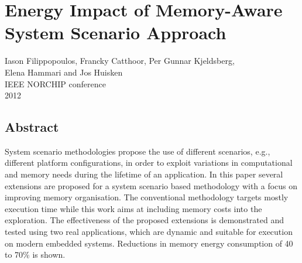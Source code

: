 %
%


\chapter{Energy Impact of Memory-Aware System Scenario Approach}

\begin{center}
Iason Filippopoulos, Francky Catthoor, Per Gunnar Kjeldsberg, \\ Elena Hammari and Jos Huisken
\\
IEEE NORCHIP conference
\\
2012
\end{center}
\afterpage{\null\newpage}
\newpage

\vspace*{\fill}
\section*{\hspace*{\fill} Abstract \hspace*{\fill}}
System scenario methodologies propose the use of different scenarios, e.g., different platform configurations, in order to exploit variations in computational and memory needs during the lifetime of an application. In this paper several extensions are proposed for a system scenario based methodology with a focus on improving memory organisation. The conventional methodology targets mostly execution time while this work aims at including memory costs into the exploration. The effectiveness of the proposed extensions is demonstrated and tested using two real applications, which are dynamic and suitable for execution on modern embedded systems. Reductions in memory energy consumption of 40 to 70\% is shown.
\vspace*{\fill}
\afterpage{\null\newpage}
\newpage

